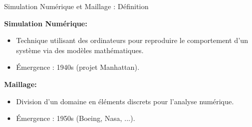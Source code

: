 \begin{frame}{Simulation Numérique et Maillage : Définition}
  
    \textbf{Simulation Numérique:}
    \begin{itemize}
      \item Technique utilisant des ordinateurs pour reproduire le comportement d'un système via des modèles mathématiques.
      \item Émergence : 1940s (projet Manhattan).
    \end{itemize}
    
    \pause
    \vspace*{.3cm}
    \textbf{Maillage:}
    \begin{itemize}
      \item Division d'un domaine en éléments discrets pour l'analyse numérique.
      \item Émergence : 1950s (Boeing, Nasa, ...).
    \end{itemize}
  
\end{frame}


